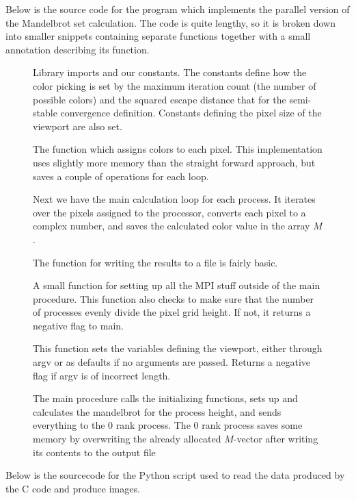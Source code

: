 \documentclass{article}
\newcounter{appx}
\newcommand{\codesnippet}[5]{
  \begin{figure}[!ht]
    
  #5
  \end{figure}
}
\newcommand{\mandelbrotsource}{../mandelbrot/mandelbrot.c}
\newcommand{\plotsource}{../mandelbrot/plot.py}
\begin{document}
\newpage
{}
Below is the source code for the program which implements the parallel version
of the Mandelbrot set calculation.
The code is quite lengthy, so it is broken down into smaller snippets containing separate functions
together with a small annotation describing its function.

\codesnippet{\mandelbrotsource}{C}{1}{8}{
Library imports and our constants.
The constants define how the color picking is set by the maximum iteration count
(the number of possible colors)
and the squared escape distance that for the semi-stable convergence definition.
Constants defining the pixel size of the viewport are also set.
}

\codesnippet{\mandelbrotsource}{C}{10}{27}{
The function which assigns colors to each pixel.
This implementation uses slightly more memory than the straight forward approach,
but saves a couple of operations for each loop.
}

\codesnippet{\mandelbrotsource}{C}{29}{45}{
Next we have the main calculation loop for each process.
It iterates over the pixels assigned to the processor,
converts each pixel to a complex number,
and saves the calculated color value in the array $M$.
}

\codesnippet{\mandelbrotsource}{C}{47}{56}{
The function for writing the results to a file is fairly basic.
}

\codesnippet{\mandelbrotsource}{C}{58}{71}{
A small function for setting up all the MPI stuff outside of the main procedure.
This function also checks to make sure that the number of processes
evenly divide the pixel grid height.
If not, it returns a negative flag to main.
}

\codesnippet{\mandelbrotsource}{C}{73}{89}{
This function sets the variables defining the viewport,
either through argv or as defaults if no arguments are passed.
Returns a negative flag if argv is of incorrect length.
}

\codesnippet{\mandelbrotsource}{C}{91}{130}{
The main procedure calls the initializing functions,
sets up and calculates the mandelbrot for the process height,
and sends everything to the 0 rank process.
The 0 rank process saves some memory by overwriting the already allocated $M$-vector
after writing its contents to the output file
}

\FloatBarrier
\newpage
{}
Below is the sourcecode for the Python script
used to read the data produced by the C code and produce images.
\codesnippet{\plotsource}{Python}{1}{34}{}
\end{document}
